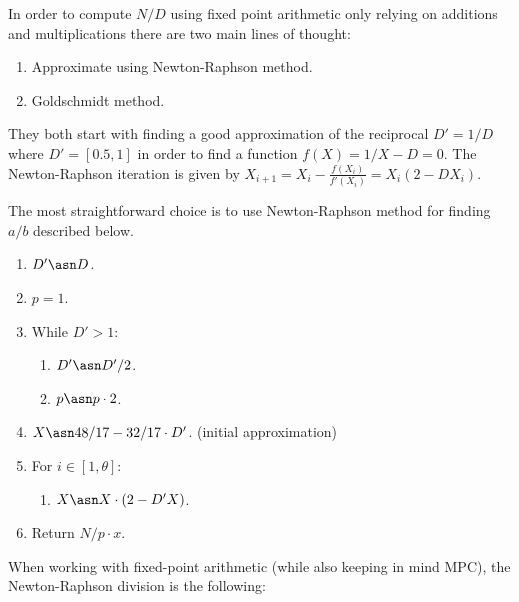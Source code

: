 \label{subsec:division}

In order to compute $N/D$ using fixed point arithmetic only relying on additions and multiplications
there are two main lines of thought:
\begin{enumerate}
  \item Approximate using Newton-Raphson method.
  \item Goldschmidt method.
\end{enumerate}

They both start with finding a good approximation of the reciprocal $D' = 1/D$
where $D' = [0.5, 1]$ in order to find a function $f(X) = 1/X - D = 0$. The
Newton-Raphson iteration is given by $X_{i+1} = X_i - \frac{f(X_i)}{f'(X_i)} =
X_i(2 - DX_i)$.

The most straightforward choice
is to use Newton-Raphson method for finding $a/b$ described below.

\begin{enumerate}
  \item $D' \asn D$.
  \item $p = 1$.
  \item While $D' > 1$:
  \begin{enumerate}
    \item $D' \asn D' / 2$.
    \item $p \asn p \cdot 2$.
  \end{enumerate}
  \item $X \asn 48/17 - 32/17 \cdot D'$. (initial approximation)
  \item For $i \in [1, \theta]$:
  \begin{enumerate}
      \item $X \asn X \cdot (2 - D'X)$.
  \end{enumerate}
  \item Return $N / p \cdot x$.
\end{enumerate}

When working with fixed-point arithmetic (while also keeping in mind MPC), the
Newton-Raphson division is the following:

